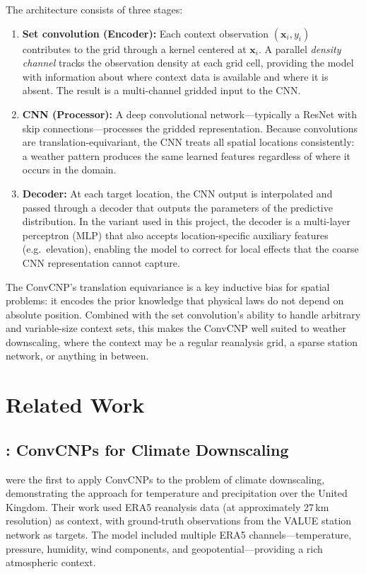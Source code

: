 The architecture consists of three stages:
%
\begin{enumerate}
    \item \textbf{Set convolution (Encoder):} Each context observation $(\mathbf{x}_i, y_i)$ contributes to the grid through a kernel centered at $\mathbf{x}_i$. A parallel \textit{density channel} tracks the observation density at each grid cell, providing the model with information about where context data is available and where it is absent. The result is a multi-channel gridded input to the CNN.

    \item \textbf{CNN (Processor):} A deep convolutional network---typically a ResNet with skip connections---processes the gridded representation. Because convolutions are translation-equivariant, the CNN treats all spatial locations consistently: a weather pattern produces the same learned features regardless of where it occurs in the domain.

    \item \textbf{Decoder:} At each target location, the CNN output is interpolated and passed through a decoder that outputs the parameters of the predictive distribution. In the variant used in this project, the decoder is a multi-layer perceptron (MLP) that also accepts location-specific auxiliary features (e.g.\ elevation), enabling the model to correct for local effects that the coarse CNN representation cannot capture.
\end{enumerate}

The ConvCNP's translation equivariance is a key inductive bias for spatial problems: it encodes the prior knowledge that physical laws do not depend on absolute position. Combined with the set convolution's ability to handle arbitrary and variable-size context sets, this makes the ConvCNP well suited to weather downscaling, where the context may be a regular reanalysis grid, a sparse station network, or anything in between.

\section{Related Work}

\subsection[Vaughan et al. (2022): ConvCNPs for Climate Downscaling]{\citet{vaughan2022}: ConvCNPs for Climate Downscaling}

\citet{vaughan2022} were the first to apply ConvCNPs to the problem of climate downscaling, demonstrating the approach for temperature and precipitation over the United Kingdom. Their work used ERA5 reanalysis data (at approximately 27\,km resolution) as context, with ground-truth observations from the VALUE station network as targets. The model included multiple ERA5 channels---temperature, pressure, humidity, wind components, and geopotential---providing a rich atmospheric context.

